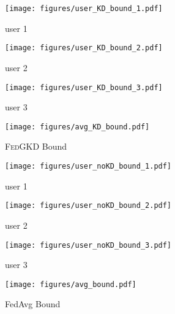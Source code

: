 \documentclass{article} %
\newcommand{\system}{\textsc{FedGKD}\xspace}
\begin{document}
\begin{figure*}[htb]
    \centering
    \begin{subfigure}[b]{0.24\textwidth}
        \centering
        \texttt{[image: figures/user\_KD\_bound\_1.pdf]}
        \caption{user 1}\label{fig:user_KD_bound_1}
    \end{subfigure}%
    \begin{subfigure}[b]{0.24\textwidth}
        \centering
        \texttt{[image: figures/user\_KD\_bound\_2.pdf]}
        \caption{user 2}\label{fig:user_KD_bound_2}
    \end{subfigure}%
    \begin{subfigure}[b]{0.24\textwidth}
        \centering
        \texttt{[image: figures/user\_KD\_bound\_3.pdf]}
        \caption{user 3}\label{fig:user_KD_bound_3}
    \end{subfigure} 
    \begin{subfigure}[b]{0.24\textwidth}
        \centering
        \texttt{[image: figures/avg\_KD\_bound.pdf]}
        \caption{\system Bound}\label{fig:avg_KD_bound}
    \end{subfigure}
    \begin{subfigure}[b]{0.24\textwidth}
        \centering
        \texttt{[image: figures/user\_noKD\_bound\_1.pdf]}
        \caption{user 1}\label{fig:user_noKD_bound_1}
    \end{subfigure}%
    \begin{subfigure}[b]{0.24\textwidth}
        \centering
        \texttt{[image: figures/user\_noKD\_bound\_2.pdf]}
        \caption{user 2}\label{fig:user_noKD_bound_2}
    \end{subfigure}%
    \begin{subfigure}[b]{0.24\textwidth}
        \centering
        \texttt{[image: figures/user\_noKD\_bound\_3.pdf]}
        \caption{user 3}\label{fig:user_noKD_bound_3}
    \end{subfigure}
    \begin{subfigure}[b]{0.24\textwidth}
        \centering
        \texttt{[image: figures/avg\_bound.pdf]}
        \caption{FedAvg Bound}\label{fig:avg_bound}
    \end{subfigure} 
    \caption{The decision bound for \system and FedAvg on toy examples.}\label{fig:toy_expamle}
\end{figure*}
\end{document}
